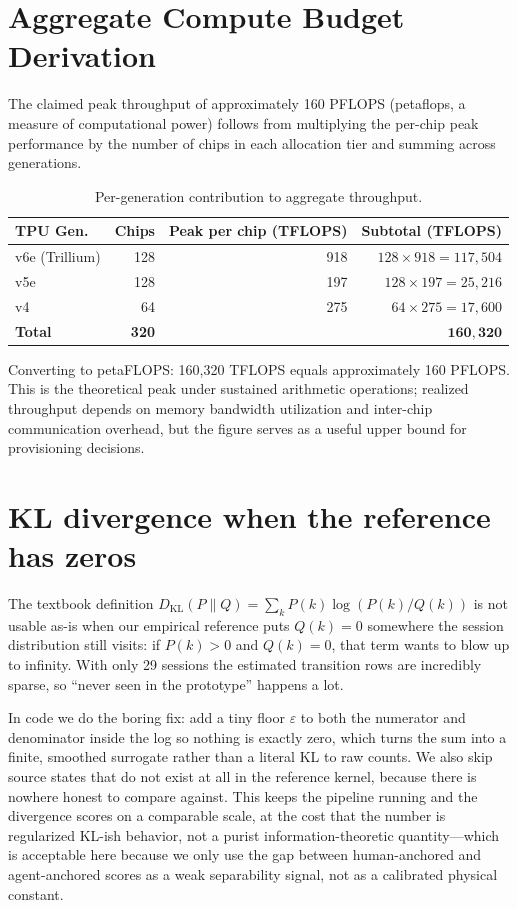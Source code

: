 \documentclass[12pt,letterpaper]{article}
\begin{document}
\section{Aggregate Compute Budget Derivation}
\label{app:compute_budget}

The claimed peak throughput of approximately 160 PFLOPS (petaflops, a measure of computational power) follows from multiplying the per-chip peak performance by the number of chips in each allocation tier and summing across generations.

\begin{table}[ht]
\centering
\caption{Per-generation contribution to aggregate throughput.}
\label{tab:compute_derivation}
\begin{tabular}{@{}lrrr@{}}
\toprule
\textbf{TPU Gen.} & \textbf{Chips} & \textbf{Peak per chip (TFLOPS)} & \textbf{Subtotal (TFLOPS)} \\
\midrule
v6e (Trillium) & 128 & 918 & $128 \times 918 = 117{,}504$ \\
v5e            & 128 & 197 & $128 \times 197 = 25{,}216$  \\
v4             &  64 & 275 & $64  \times 275 = 17{,}600$  \\
\midrule
\textbf{Total} & \textbf{320} & & $\mathbf{160{,}320}$ \\
\bottomrule
\end{tabular}
\end{table}

Converting to petaFLOPS: 160,320 TFLOPS equals approximately 160 PFLOPS. This is the theoretical peak under sustained arithmetic operations; realized throughput depends on memory bandwidth utilization and inter-chip communication overhead, but the figure serves as a useful upper bound for provisioning decisions.

\section{KL divergence when the reference has zeros}
\label{app:kl_zeros}

The textbook definition $D_{\mathrm{KL}}(P\parallel Q)=\sum_k P(k)\log(P(k)/Q(k))$ is not usable as-is when our empirical reference puts $Q(k)=0$ somewhere the session distribution still visits: if $P(k)>0$ and $Q(k)=0$, that term wants to blow up to infinity. With only 29 sessions the estimated transition rows are incredibly sparse, so ``never seen in the prototype'' happens a lot.

In code we do the boring fix: add a tiny floor $\varepsilon$ to both the numerator and denominator inside the log so nothing is exactly zero, which turns the sum into a finite, smoothed surrogate rather than a literal KL to raw counts. We also skip source states that do not exist at all in the reference kernel, because there is nowhere honest to compare against. This keeps the pipeline running and the divergence scores on a comparable scale, at the cost that the number is regularized KL-ish behavior, not a purist information-theoretic quantity---which is acceptable here because we only use the gap between human-anchored and agent-anchored scores as a weak separability signal, not as a calibrated physical constant.
\end{document}
